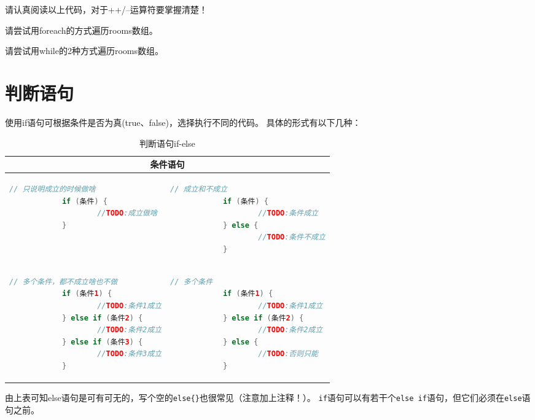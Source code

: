 \noindent
请认真阅读以上代码，对于++/--运算符要掌握清楚！
\bigskip

\begin{exercise}
	请尝试用foreach的方式遍历rooms数组。
\end{exercise}

\begin{exercise}
	请尝试用while的2种方式遍历rooms数组。
\end{exercise}

\section{判断语句}
使用if语句可根据条件是否为真(true、false)，选择执行不同的代码。
具体的形式有以下几种：

\begin{table}[!htbp]\centering
	\lstset{frame=none, aboveskip=0mm, belowskip=0mm}
	\begin{tabular}{|p{6.5cm}|p{6.5cm}|}
	\hline
	\multicolumn{2}{|c|}{条件语句}\\
	\hline
	\begin{lstlisting}[language=Java]
			// 只说明成立的时候做啥
			if (条件) {
					//TODO:成立做啥
			}
	\end{lstlisting}
	&
	\begin{lstlisting}[language=Java]
			// 成立和不成立
			if (条件) {
					//TODO:条件成立
			} else {
					//TODO:条件不成立
			}
	\end{lstlisting} \\
	\hline
	\begin{lstlisting}[language=Java]
			// 多个条件，都不成立啥也不做
			if (条件1) {
					//TODO:条件1成立
			} else if (条件2) {
					//TODO:条件2成立
			} else if (条件3) {
					//TODO:条件3成立
			}
	\end{lstlisting}
	&
	\begin{lstlisting}[language=Java]
			// 多个条件
			if (条件1) {
					//TODO:条件1成立
			} else if (条件2) {
					//TODO:条件2成立
			} else {
					//TODO:否则只能
			}
	\end{lstlisting} \\
	\hline
	\end{tabular}
	\caption{判断语句if-else}
\end{table}
	
由上表可知else语句是可有可无的，写个空的\lstinline!else{}!也很常见（注意加上注释！）。
\lstinline{if}语句可以有若干个\lstinline{else if}语句，但它们必须在\lstinline{else}语句之前。
\bigskip

